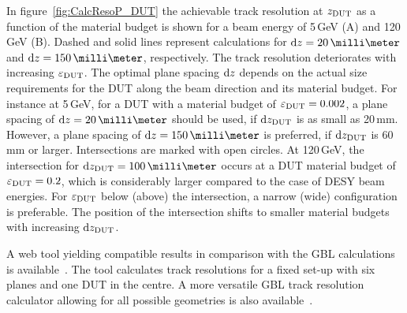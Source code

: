 In figure~\ref{fig:CalcResoP_DUT} the achievable track resolution at $z_{\textrm{DUT}}$ as a function of the material budget is shown for a beam energy of 5\,GeV (A) and 120\,GeV (B).
Dashed and solid lines represent calculations for $\dz = 20\,\milli\meter$ and $\dz = 150\,\milli\meter$, respectively. 
The track resolution deteriorates with increasing $\mathnormal{\varepsilon_{\textrm{DUT}}}$. 
The optimal plane spacing $\textrm{d}z$ depends on the actual size requirements for the DUT along the beam direction and its material budget.
For instance at 5\,GeV, for a DUT with a material budget of $\mathnormal{\varepsilon_{\textrm{DUT}}} = 0.002$, a plane spacing of $\dz = 20\,\milli\meter$ should be used, if $\textrm{d}z_{\textrm{DUT}}$ is as small as 20\,mm. 
However, a plane spacing of $\dz = 150\,\milli\meter$ is preferred, if $\textrm{d}z_{\textrm{DUT}}$ is 60\,mm or larger. 
Intersections are marked with open circles. 
At 120\,GeV, the intersection for $\dzdut = 100\,\milli\meter$ occurs at a DUT material budget of $\mathnormal{\varepsilon_{\textrm{DUT}}} = 0.2$, which is considerably larger compared to the case of DESY beam energies.
For $\mathnormal{\varepsilon_{\textrm{DUT}}}$ below (above) the intersection, a narrow (wide) configuration is preferable. 
The position of the intersection shifts to smaller material budgets with increasing $\textrm{d}z_{\textrm{DUT}}$. 

A web tool yielding compatible results in comparison with the GBL calculations is available~\cite{webtool}. 
The tool calculates track resolutions for a fixed set-up with six planes and one DUT in the centre. 
A more versatile GBL track resolution calculator allowing for all possible geometries is also available~\cite{gbltool}. 
